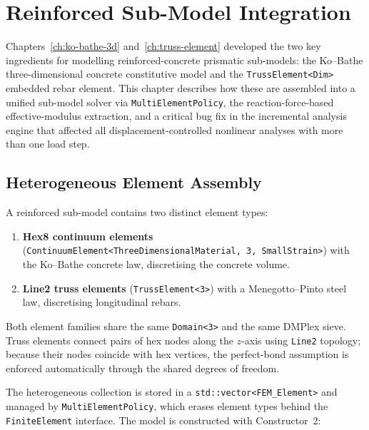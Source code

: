 
\chapter{Reinforced Sub-Model Integration}
\label{ch:reinforced-submodel}

Chapters~\ref{ch:ko-bathe-3d} and~\ref{ch:truss-element} developed the two
key ingredients for modelling reinforced-concrete prismatic sub-models:
the Ko--Bathe three-dimensional concrete constitutive model and the
\texttt{TrussElement<Dim>} embedded rebar element.  This chapter describes
how these are assembled into a unified sub-model solver via
\texttt{MultiElementPolicy}, the reaction-force-based effective-modulus
extraction, and a critical bug fix in the incremental analysis engine
that affected all displacement-controlled nonlinear analyses with more
than one load step.


\section{Heterogeneous Element Assembly}
\label{sec:reinf-hetero}

A reinforced sub-model contains two distinct element types:

\begin{enumerate}
  \item \textbf{Hex8 continuum elements}
        (\texttt{ContinuumElement<ThreeDimensionalMaterial, 3, SmallStrain>})
        with the Ko--Bathe concrete law, discretising the concrete volume.
  \item \textbf{Line2 truss elements}
        (\texttt{TrussElement<3>}) with a Menegotto--Pinto steel law,
        discretising longitudinal rebars.
\end{enumerate}

Both element families share the same \texttt{Domain<3>} and the same DMPlex
sieve.  Truss elements connect pairs of hex nodes along the $z$-axis using
\texttt{Line2} topology; because their nodes coincide with hex vertices, the
perfect-bond assumption is enforced automatically through the shared
degrees of freedom.

The heterogeneous collection is stored in a
\texttt{std::vector<FEM\_Element>} and managed by \texttt{MultiElementPolicy},
which erases element types behind the \texttt{FiniteElement} interface.
The model is constructed with Constructor~2:


